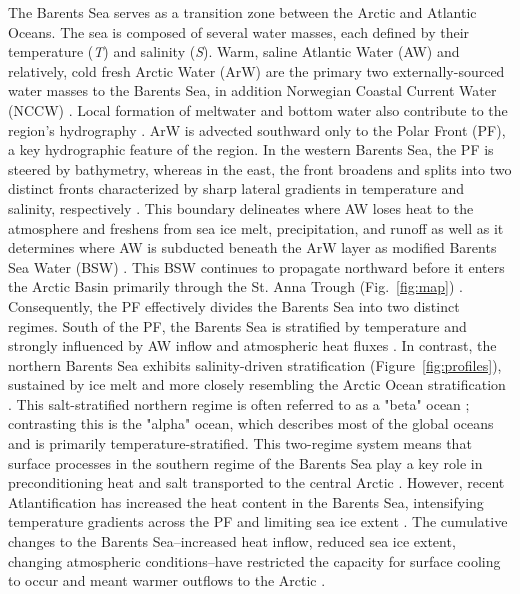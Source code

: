 \documentclass[draft]{agujournal2019}
\begin{document}
The Barents Sea serves as a transition zone between the Arctic and Atlantic Oceans. The sea is composed of several water masses, each defined by their temperature (\emph{T}) and salinity (\emph{S}). Warm, saline Atlantic Water (AW) and relatively, cold fresh Arctic Water (ArW) are the primary two externally-sourced water masses to the Barents Sea, in addition Norwegian Coastal Current Water (NCCW) \cite{Loeng1991,Smedsrud2010}. Local formation of meltwater and bottom water also contribute to the region's hydrography \cite{Oziel2016}. ArW is advected southward only to the Polar Front (PF), a key hydrographic feature of the region. In the western Barents Sea, the PF is steered by bathymetry, whereas in the east, the front broadens and splits into two distinct fronts characterized by sharp lateral gradients in temperature and salinity, respectively \cite{Oziel2016}. This boundary delineates where AW loses heat to the atmosphere and freshens from sea ice melt, precipitation, and runoff as well as it determines where AW is subducted beneath the ArW layer as modified Barents Sea Water (BSW) \cite{Oziel2016,Barton18}. This BSW continues to propagate northward before it enters the Arctic Basin primarily through the St. Anna Trough (Fig.~\ref{fig:map}) \cite{schauer2002}. Consequently, the PF effectively divides the Barents Sea into two distinct regimes. South of the PF, the Barents Sea is stratified by temperature and strongly influenced by AW inflow and atmospheric heat fluxes \cite{Hakkinen2009}. In contrast, the northern Barents Sea exhibits salinity-driven stratification (Figure~\ref{fig:profiles}), sustained by ice melt and more closely resembling the Arctic Ocean stratification \cite{kolas2024}. This salt-stratified northern regime is often referred to as a "beta" ocean \cite{Nansen1902,Carmack2007,Stewart2016}; contrasting this is the "alpha" ocean, which describes most of the global oceans and is primarily temperature-stratified. This two-regime system means that surface processes in the southern regime of the Barents Sea play a key role in preconditioning heat and salt transported to the central Arctic \cite{Parsons1996,Munk1998,Garrett2003,Vage2014,kolas2024}. However, recent Atlantification has increased the heat content in the Barents Sea, intensifying temperature gradients across the PF and limiting sea ice extent \cite{Barton18}. The cumulative changes to the Barents Sea--increased heat inflow, reduced sea ice extent, changing atmospheric conditions--have restricted the capacity for surface cooling to occur and meant warmer outflows to the Arctic \cite{Skagseth2020}.
\end{document}
